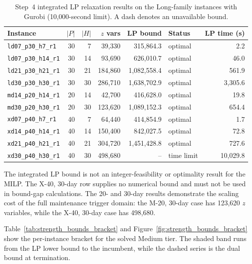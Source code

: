 \begin{table}[htbp]
\centering\small
\caption{Step~4 integrated LP relaxation results on the Long-family instances
with Gurobi (10{,}000-second limit). A dash denotes an unavailable bound.}
\label{tab:step4_long_family_lp}
\begin{tabular}{l r r r r l r}
\toprule
Instance & $|P|$ & $|H|$ & $z$ vars & LP bound & Status & LP time (s) \\
\midrule
\texttt{ld07\_p30\_h7\_r1}  & 30 &  7 &  39{,}330 &   315{,}864.3 & optimal &      2.2 \\
\texttt{ld07\_p30\_h14\_r1} & 30 & 14 &  93{,}690 &   626{,}010.7 & optimal &     46.0 \\
\texttt{ld21\_p30\_h21\_r1} & 30 & 21 & 184{,}860 & 1{,}082{,}558.4 & optimal &    561.9 \\
\texttt{ld30\_p30\_h30\_r1} & 30 & 30 & 286{,}710 & 1{,}638{,}702.9 & optimal &  3{,}305.6 \\
\texttt{md14\_p20\_h14\_r1} & 20 & 14 &  42{,}700 &   416{,}628.0 & optimal &     19.8 \\
\texttt{md30\_p20\_h30\_r1} & 20 & 30 & 123{,}620 & 1{,}089{,}152.3 & optimal &    654.4 \\
\texttt{xd07\_p40\_h7\_r1}  & 40 &  7 &  64{,}440 &   414{,}854.9 & optimal &      1.7 \\
\texttt{xd14\_p40\_h14\_r1} & 40 & 14 & 150{,}400 &   842{,}027.5 & optimal &     72.8 \\
\texttt{xd21\_p40\_h21\_r1} & 40 & 21 & 304{,}720 & 1{,}451{,}428.8 & optimal &    727.6 \\
\texttt{xd30\_p40\_h30\_r1} & 40 & 30 & 498{,}680 &              -- & time limit & 10{,}029.8 \\
\bottomrule
\end{tabular}
\end{table}

The integrated LP bound is not an integer-feasibility or optimality result for
the MILP. The X-40, 30-day row supplies no numerical bound and must not be used
in bound-gap calculations. The 20- and 30-day results demonstrate the scaling
cost of the full maintenance trigger domain: the M-20, 30-day case has
123{,}620 $z$ variables, while the X-40, 30-day case has 498{,}680.

Table~\ref{tab:strength_bounds_bracket} and Figure~\ref{fig:strength_bounds_bracket}
show the per-instance bracket for the solved Medium tier. The shaded band runs
from the LP lower bound to the incumbent, while the dashed series is the dual
bound at termination.

